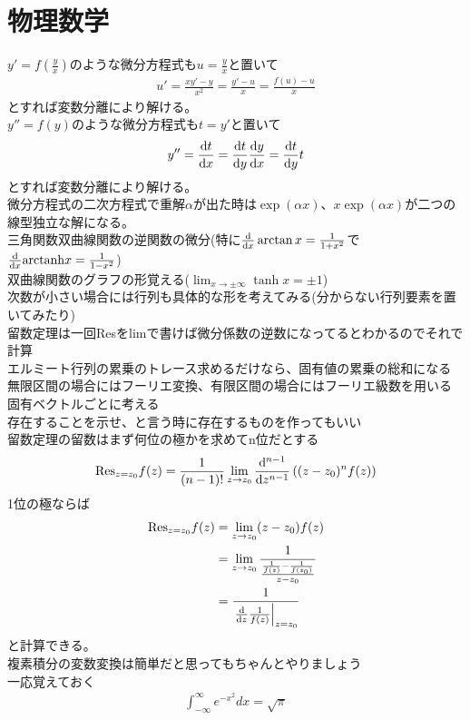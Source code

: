 \documentclass{ltjsarticle}
\begin{document}
  \section{物理数学}
  $y'=f\left( \frac{y}{x} \right) $のような微分方程式も$u=\frac{y}{x}$と置いて
  \begin{align}
    u'=\frac{xy'-y}{x^2}=\frac{y'-u}{x}=\frac{f(u)-u}{x}
  \end{align}
  とすれば変数分離により解ける。\\
  $y''=f(y)$のような微分方程式も$t=y'$と置いて
  \begin{align}
    y''=\dv{t}{x}=\dv{t}{y}\dv{y}{x}=\dv{t}{y}t
  \end{align}
  とすれば変数分離により解ける。\\
  微分方程式の二次方程式で重解$\alpha$が出た時は$\exp\left( \alpha x \right) $、$x \exp\left( \alpha x \right) $が二つの線型独立な解になる。\\
  三角関数双曲線関数の逆関数の微分(特に$\dv{x}\arctan{x}=\frac{1}{1+x^2}$で$\dv{x}\mathrm{arctanh}{x}=\frac{1}{1-x^2}$)\\
  双曲線関数のグラフの形覚える($\lim_{x\to\pm\infty}\tanh{x}=\pm 1$)\\
  次数が小さい場合には行列も具体的な形を考えてみる(分からない行列要素を置いてみたり)\\
  留数定理は一回Resをlimで書けば微分係数の逆数になってるとわかるのでそれで計算\\
  エルミート行列の累乗のトレース求めるだけなら、固有値の累乗の総和になる\\
  無限区間の場合にはフーリエ変換、有限区間の場合にはフーリエ級数を用いる\\
  固有ベクトルごとに考える\\
  存在することを示せ、と言う時に存在するものを作ってもいい\\
  留数定理の留数はまず何位の極かを求めてn位だとする
  \begin{align}
    \mathrm{Res}_{z=z_0}f(z)=\frac{1}{(n-1)!}\lim_{z\to z_0}\dv[n-1]{z}\left((z-z_0)^nf(z)\right)
  \end{align}
  1位の極ならば
  \begin{align}
    \mathrm{Res}_{z=z_0}f(z)&=\lim_{z\to z_0}(z-z_0)f(z)\\
    &=\lim_{z\to z_0}\frac{1}{\frac{\frac{1}{f(z)}-\frac{1}{f(z_0)}}{z-z_0}}\\
    &=\frac{1}{\eval{\dv{z}\frac{1}{f(z)}}_{z=z_0}}\\
  \end{align}
  と計算できる。\\
  複素積分の変数変換は簡単だと思ってもちゃんとやりましょう\\
  一応覚えておく
  \begin{align}
    \int_{-\infty}^{\infty}e^{-x^2}dx=\sqrt{\pi}
  \end{align}
\end{document}
